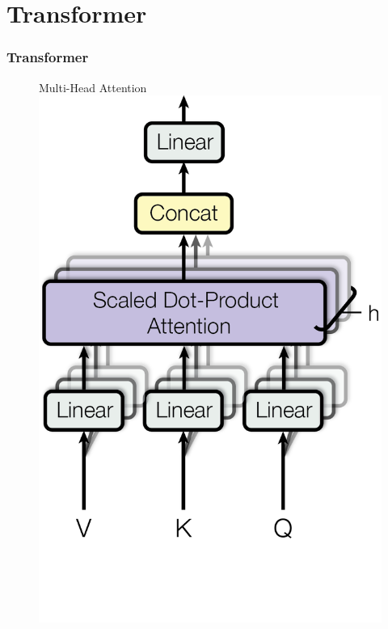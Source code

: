 \section{Transformer}
\label{sec:transformer}
\begin{frame}
\frametitle{Transformer}
\begin{figure}
    \begin{minipage}[t]{0.5\textwidth}
      \centering 
      Multi-Head Attention \\
      \vspace{0.1cm}
      \includegraphics[scale=0.6]{./tokenformer-paper/Figures/ModalNet-20}  

\end{minipage}
\end{figure}
\end{frame}
